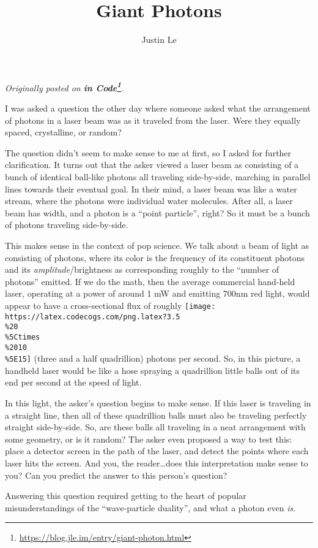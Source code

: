 \documentclass[]{article}
\title{Giant Photons}
\author{Justin Le}
\renewcommand{\href}[2]{#2\footnote{\url{#1}}}
\begin{document}
\maketitle

\emph{Originally posted on
\textbf{\href{https://blog.jle.im/entry/giant-photon.html}{in Code}}.}

I was asked a question the other day where someone asked what the arrangement of
photons in a laser beam was as it traveled from the laser. Were they equally
spaced, crystalline, or random?

The question didn't seem to make sense to me at first, so I asked for further
clarification. It turns out that the asker viewed a laser beam as consisting of
a bunch of identical ball-like photons all traveling side-by-side, marching in
parallel lines towards their eventual goal. In their mind, a laser beam was like
a water stream, where the photons were individual water molecules. After all, a
laser beam has width, and a photon is a ``point particle'', right? So it must be
a bunch of photons traveling side-by-side.

This makes sense in the context of pop science. We talk about a beam of light as
consisting of photons, where its color is the frequency of its constituent
photons and its \emph{amplitude}/brightness as corresponding roughly to the
``number of photons'' emitted. If we do the math, then the average commercial
hand-held laser, operating at a power of around 1 mW and emitting 700nm red
light, would appear to have a cross-sectional flux of roughly
\texttt{[image: https://latex.codecogs.com/png.latex?3.5\\\%20\\\%5Ctimes\\\%2010\\\%5E15]}
(three and a half quadrillion) photons per second. So, in this picture, a
handheld laser would be like a hose spraying a quadrillion little balls out of
its end per second at the speed of light.

In this light, the asker's question begins to make sense. If this laser is
traveling in a straight line, then all of these quadrillion balls must also be
traveling perfectly straight side-by-side. So, are these balls all traveling in
a neat arrangement with some geometry, or is it random? The asker even proposed
a way to test this: place a detector screen in the path of the laser, and detect
the points where each laser hits the screen. And you, the reader\ldots does this
interpretation make sense to you? Can you predict the answer to this person's
question?

Answering this question required getting to the heart of popular
misunderstandings of the ``wave-particle duality'', and what a photon even
\emph{is}.
\end{document}
